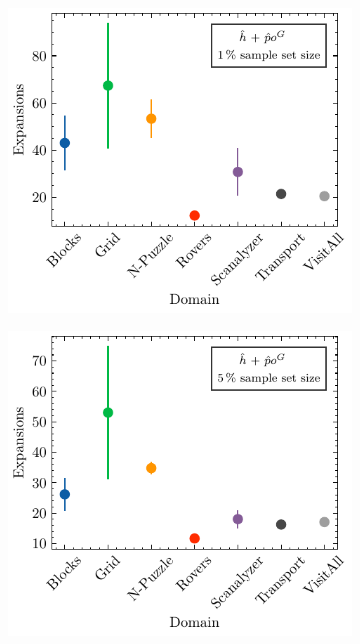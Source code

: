 \documentclass[ppgc,diss,english]{iiufrgs}
\begin{document}
\begin{figure}[tb]
  \caption[Standard deviation of expansions using \pog]{Mean number of expansions and its standard deviation per domain for GBFS guided by different heuristics with \pog trained using sample sets of different sizes.}
  \centering
  \vspace{\baselineskip}
  \begin{subfigure}{0.41\textwidth}
    \centering
    \includegraphics[width=\linewidth]{img/error_hNN_poG_1pct.pdf}
  \end{subfigure}
  \begin{subfigure}{0.41\textwidth}
    \centering
    \includegraphics[width=\linewidth]{img/error_hNN_poG_5pct.pdf}
  \end{subfigure}



\end{figure}
\end{document}
